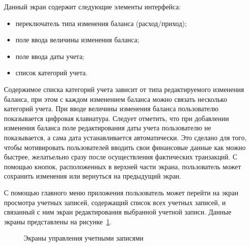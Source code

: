 Данный экран содержит следующие элементы интерфейса:
\begin{itemize}
\item переключатель типа изменения баланса (расход/приход);
\item поле ввода величины изменения баланса;
\item поле ввода даты учета;
\item список категорий учета.
\end{itemize}

Содержимое списка категорий учета зависит от типа редактируемого
изменения баланса, при этом с каждом изменением баланса можно связать несколько
категорий учета.
При вводе величины изменения баланса пользователю показывается цифровая клавиатура.
Следует отметить, что при добавлении изменения баланса поле редактирования
даты учета пользователю не показывается, а сама дата устанавливается автоматически.
Это сделано для того, чтобы мотивировать пользователей
вводить свои финансовые данные как можно быстрее,
желатьельно сразу после осуществления фактических транзакций.
С помощью кнопок, расположенных в верхней части экрана, пользователь
может сохранить изменения или вернуться на предыдущий экран.

С помощью главного меню приложения пользователь может перейти на
экран просмотра учетных записей, содержащий список всех учетных записей,
и связанный с ним экран редактирования выбранной учетной записи.
Данные экраны представлены на рисунке~\ref{fig:implementation_ui_activity_account}.

\begin{figure}[h!]
  \centering
  \caption{Экраны управления учетными записями}
  \label{fig:implementation_ui_activity_account}
\end{figure}

